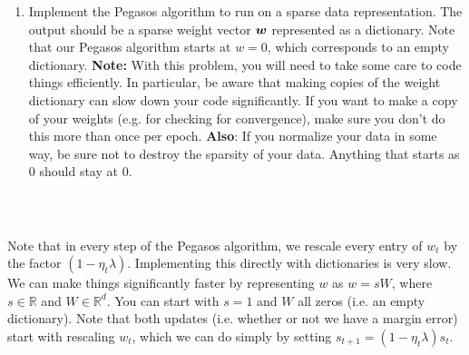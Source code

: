 \documentclass{article}
\theoremstyle{plain}
\theoremstyle{definition}
\begin{document}
\begin{enumerate}
  \setcounter{enumi}{\value{saveenum}}
\item Implement the Pegasos algorithm to run on a sparse data representation.
The output should be a sparse weight vector $\boldsymbol{w}$ represented as a dictionary. Note that our Pegasos
algorithm starts at $w=0$, which corresponds
to an empty dictionary. \textbf{Note:} With this problem, you will
need to take some care to code things efficiently. In particular,
be aware that making copies of the weight dictionary can slow down
your code significantly. If you want to make a copy of your weights
(e.g. for checking for convergence), make sure you don't do this more
than once per epoch. \textbf{Also}: If you normalize your data in
some way, be sure not to destroy the sparsity of your data. Anything
that starts as $0$ should stay at $0$.
\begin{itemize}
    \color{blue}
      \inputminted[firstline=1039, lastline=1070, breaklines=True]{python}{hw_3.py}
\end{itemize}


\\
\setcounter{saveenum}{\value{enumi}}
\end{enumerate}
Note that in every step of the Pegasos algorithm, we rescale every
entry of $w_{t}$ by the factor $(1-\eta_{t}\lambda)$. Implementing
this directly with dictionaries is very slow. We can make things significantly
faster by representing $w$ as $w=sW$, where $s\in\mathbb{R}$ and $W\in\mathbb{R}^{d}$.
You can start with $s=1$ and $W$ all zeros (i.e. an empty dictionary).
Note that both updates (i.e. whether or not we have a margin error)
start with rescaling $w_{t}$, which we can do simply by setting $s_{t+1}=\left(1-\eta_{t}\lambda\right)s_{t}$.
\end{document}
